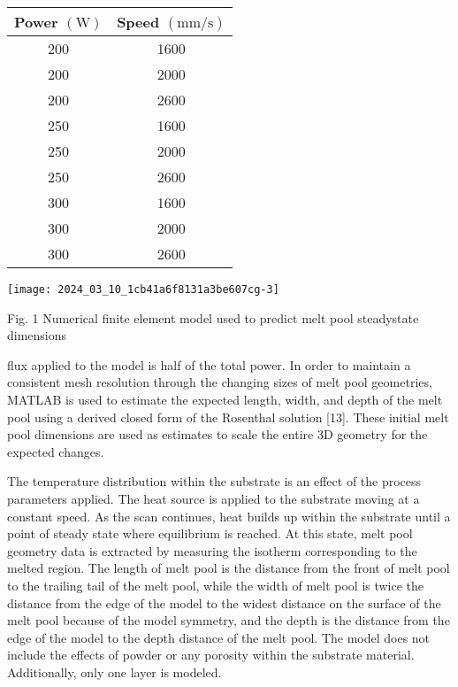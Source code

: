 \documentclass[10pt]{article}
\begin{document}
\begin{center}
\begin{tabular}{cc}
\hline
Power $(\mathrm{W})$ & Speed $(\mathrm{mm} / \mathrm{s})$ \\
\hline
200 & 1600 \\
200 & 2000 \\
200 & 2600 \\
250 & 1600 \\
250 & 2000 \\
250 & 2600 \\
300 & 1600 \\
300 & 2000 \\
300 & 2600 \\
\hline
\end{tabular}
\end{center}

\begin{center}
\texttt{[image: 2024\_03\_10\_1cb41a6f8131a3be607cg-3]}
\end{center}

Fig. 1 Numerical finite element model used to predict melt pool steadystate dimensions

flux applied to the model is half of the total power. In order to maintain a consistent mesh resolution through the changing sizes of melt pool geometries, MATLAB is used to estimate the expected length, width, and depth of the melt pool using a derived closed form of the Rosenthal solution [13]. These initial melt pool dimensions are used as estimates to scale the entire 3D geometry for the expected changes.

The temperature distribution within the substrate is an effect of the process parameters applied. The heat source is applied to the substrate moving at a constant speed. As the scan continues, heat builds up within the substrate until a point of steady state where equilibrium is reached. At this state, melt pool geometry data is extracted by measuring the isotherm corresponding to the melted region. The length of melt pool is the distance from the front of melt pool to the trailing tail of the melt pool, while the width of melt pool is twice the distance from the edge of the model to the widest distance on the surface of the melt pool because of the model symmetry, and the depth is the distance from the edge of the model to the depth distance of the melt pool. The model does not include the effects of powder or any porosity within the substrate material. Additionally, only one layer is modeled.
\end{document}

